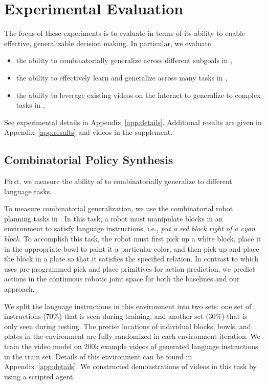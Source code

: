 
\section{Experimental Evaluation}\label{sec:experiment}

The focus of these experiments is to evaluate \model in terms of its ability to enable effective, generalizable decision making. In particular, we evaluate
\begin{itemize}[leftmargin=2em, itemsep=0pt]
    \item[{\bf (1)}] the ability to combinatorially generalize across different subgoals in , 
    \item[{\bf (2)}] the ability to effectively learn and generalize across many tasks in ,
    \item[{\bf (3)}] the ability to leverage existing videos on the internet to generalize to complex tasks in .
\end{itemize}
See experimental details in Appendix~\ref{app:details}. 
Additional results are given in Appendix~\ref{app:results} and videos 
in the supplement.


\subsection{Combinatorial Policy Synthesis}
\label{sect:combinatorical}

First, we measure the ability of \model to combinatorially generalize to different language tasks.

 To measure combinatorial generalization, we use the combinatorial robot planning tasks in \citep{Mao2022PDSketch}. In this task, a robot must manipulate blocks in an environment to satisfy language instructions, i.e., {\it put a red block right of a cyan block}. To accomplish this task, the robot must first pick up a white block, place it in the appropriate bowl to paint it a particular color, and then pick up and place the block in a plate so that it satisfies the specified relation. In contrast to \citep{Mao2022PDSketch} which uses pre-programmed pick and place primitives for action prediction, we predict actions in the continuous robotic joint space for both the baselines and our approach.

We split the language instructions in this environment into two sets: one set of instructions (70\%) that is seen during training, and another set (30\%) that is only seen during testing. The precise locations of individual blocks, bowls, and plates in the environment are fully randomized in each environment iteration. We train the video model on 200k example videos of generated language instructions in the train set. Details of this environment can be found in Appendix~\ref{app:details}. We constructed demonstrations of videos in this task by using a scripted agent.

